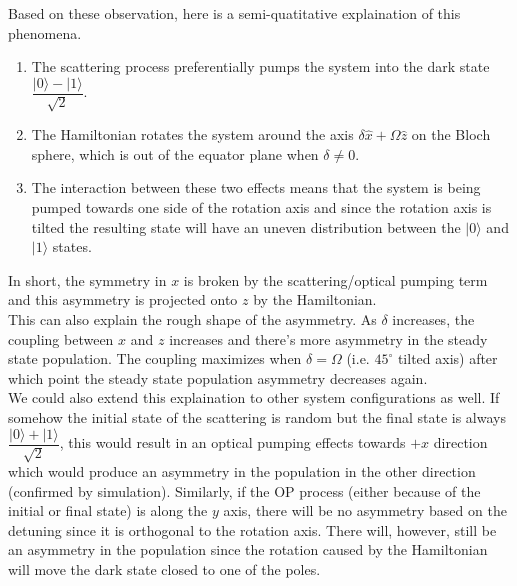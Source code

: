 \documentclass[10pt,fleqn]{article}
\begin{document}
Based on these observation, here is a semi-quatitative explaination of this phenomena.
\begin{enumerate}
\item The scattering process preferentially pumps the system into the dark state
  $\dfrac{|0\rangle-|1\rangle}{\sqrt2}$.
\item The Hamiltonian rotates the system around the axis $\delta\hat x+\Omega\hat z$
  on the Bloch sphere, which is out of the equator plane when $\delta\neq0$.
\item The interaction between these two effects means that the system
  is being pumped towards one side of the rotation axis
  and since the rotation axis is tilted the resulting state will have an uneven
  distribution between the $|0\rangle$ and $|1\rangle$ states.
\end{enumerate}
In short, the symmetry in $x$ is broken by the scattering/optical pumping term
and this asymmetry is projected onto $z$ by the Hamiltonian.\\

This can also explain the rough shape of the asymmetry. As $\delta$ increases,
the coupling between $x$ and $z$ increases and there's more asymmetry
in the steady state population. The coupling maximizes when $\delta=\Omega$
(i.e. $45^\circ$ tilted axis) after which point the steady state population
asymmetry decreases again.\\

We could also extend this explaination to other system configurations as well.
If somehow the initial state of the scattering is random but the final state
is always $\dfrac{|0\rangle+|1\rangle}{\sqrt2}$, this would result in an optical
pumping effects towards $+x$ direction which would produce an asymmetry
in the population in the other direction (confirmed by simulation).
Similarly, if the OP process (either because of the initial or final state)
is along the $y$ axis, there will be no asymmetry based on the detuning
since it is orthogonal to the rotation axis.
There will, however, still be an asymmetry in the population
since the rotation caused by the Hamiltonian will move the dark state
closed to one of the poles.
\end{document}
